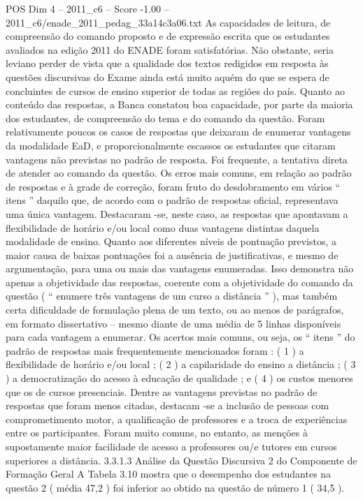 \begin{textsample}{POS Dim 4 – 2011\_c6 – Score -1.00 – 2011\_c6/enade\_2011\_pedag\_33a14c3a06.txt}
As capacidades de leitura, de compreensão do comando proposto e de expressão escrita que os estudantes avaliados na edição 2011 do ENADE foram satisfatórias.
Não obstante, seria leviano perder de vista que a qualidade dos textos redigidos em resposta às questões discursivas do Exame ainda está muito aquém do que se espera de concluintes de cursos de ensino superior de todas as regiões do país.
Quanto ao conteúdo das respostas, a Banca constatou boa capacidade, por parte da maioria dos estudantes, de compreensão do tema e do comando da questão.
Foram relativamente poucos os casos de respostas que deixaram de enumerar vantagens da modalidade EaD, e proporcionalmente escassos os estudantes que citaram vantagens não previstas no padrão de resposta.
Foi frequente, a tentativa direta de atender ao comando da questão.
Os erros mais comuns, em relação ao padrão de respostas e à grade de correção, foram fruto do desdobramento em vários “ itens ” daquilo que, de acordo com o padrão de respostas oficial, representava uma única vantagem.
Destacaram -se, neste caso, as respostas que apontavam a flexibilidade de horário e/ou local como duas vantagens distintas daquela modalidade de ensino.
Quanto aos diferentes níveis de pontuação previstos, a maior causa de baixas pontuações foi a ausência de justificativas, e mesmo de argumentação, para uma ou mais das vantagens enumeradas.
Isso demonstra não apenas a objetividade das respostas, coerente com a objetividade do comando da questão ( “ enumere três vantagens de um curso a distância ” ), mas também certa dificuldade de formulação plena de um texto, ou ao menos de parágrafos, em formato dissertativo – mesmo diante de uma média de 5 linhas disponíveis para cada vantagem a enumerar.
Os acertos mais comuns, ou seja, os “ itens ” do padrão de respostas mais frequentemente mencionados foram : ( 1 ) a flexibilidade de horário e/ou local ; ( 2 ) a capilaridade do ensino a distância ; ( 3 ) a democratização do acesso à educação de qualidade ; e ( 4 ) os custos menores que os de cursos presenciais.
Dentre as vantagens previstas no padrão de respostas que foram menos citadas, destacam -se a inclusão de pessoas com comprometimento motor, a qualificação de professores e a troca de experiências entre os participantes.
Foram muito comuns, no entanto, as menções à supostamente maior facilidade de acesso a professores ou/e tutores em cursos superiores a distância. 3.3.1.3 Análise da Questão Discursiva 2 do Componente de Formação Geral A Tabela 3.10 mostra que o desempenho dos estudantes na questão 2 ( média 47,2 ) foi inferior ao obtido na questão de número 1 ( 34,5 ).

\end{textsample}
